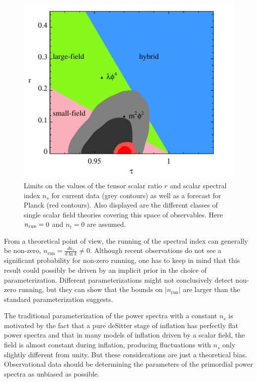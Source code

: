 \documentclass[a4paper,11pt]{article}
\begin{document}
\begin{figure}
\centering
  \includegraphics[width=0.9\linewidth]{ns_r_inf_models}
  \caption{Limits on the values of the tensor scalar ratio $r$ and
    scalar spectral index $n_s$ for current data (grey contours) as
    well as a forecast for Planck (red contours). Also displayed are
    the different classes of single scalar field theories covering
    this space of observables. Here $n_{\rm run}=0$ and $n_t=0$ are assumed.}
  \label{fig:r-ns}
\end{figure}

From a theoretical point of view, the running of the spectral index
can generally be non-zero, $n_{\mathrm{run}}=\frac{d n_s}{d\ln k}\neq
0$. Although recent observations do not see a significant probability
for non-zero running, one has to keep in mind that this result could
possibly be driven by an implicit prior in the choice of
parameterization. Different parameterizations might not conclusively
detect non-zero running, but they can show that the bounds on
$\left|n_{\mathrm{run}}\right|$ are larger than the standard
parameterization suggests.

The traditional parameterization of the power spectra with a constant
$n_s$ is motivated by the fact that a pure deSitter stage of inflation
has perfectly flat power spectra and that in many models of inflation
driven by a scalar field, the field is almost constant during
inflation, producing fluctuations with $n_s$ only slightly different
from unity. But these considerations are just a theoretical
bias. Observational data should be determining the parameters of the
primordial power spectra as unbiased as possible.
\end{document}
